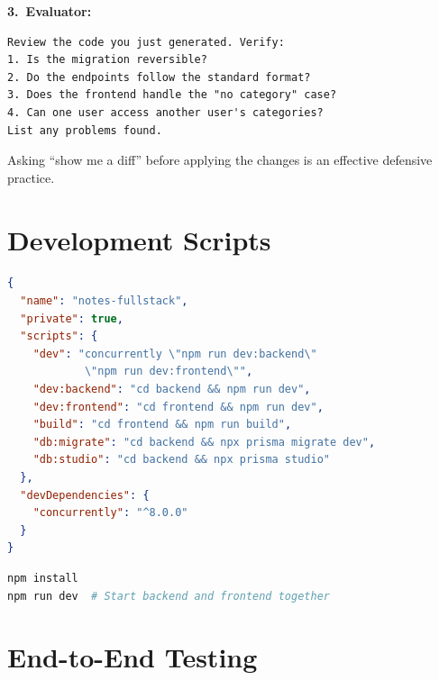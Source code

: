 \textbf{3.\ Evaluator:}
\begin{lstlisting}[language={}]
Review the code you just generated. Verify:
1. Is the migration reversible?
2. Do the endpoints follow the standard format?
3. Does the frontend handle the "no category" case?
4. Can one user access another user's categories?
List any problems found.
\end{lstlisting}

\begin{tipbox}
Asking ``show me a diff'' before applying the changes is an effective defensive practice.
\end{tipbox}

\section{Development Scripts}

\begin{praticabox}[title={Hands-On --- Root npm scripts}]
\begin{lstlisting}[language=json,title={root \texttt{package.json}}]
{
  "name": "notes-fullstack",
  "private": true,
  "scripts": {
    "dev": "concurrently \"npm run dev:backend\"
            \"npm run dev:frontend\"",
    "dev:backend": "cd backend && npm run dev",
    "dev:frontend": "cd frontend && npm run dev",
    "build": "cd frontend && npm run build",
    "db:migrate": "cd backend && npx prisma migrate dev",
    "db:studio": "cd backend && npx prisma studio"
  },
  "devDependencies": {
    "concurrently": "^8.0.0"
  }
}
\end{lstlisting}
\begin{lstlisting}[language=bash]
npm install
npm run dev  # Start backend and frontend together
\end{lstlisting}
\end{praticabox}

\section{End-to-End Testing}


